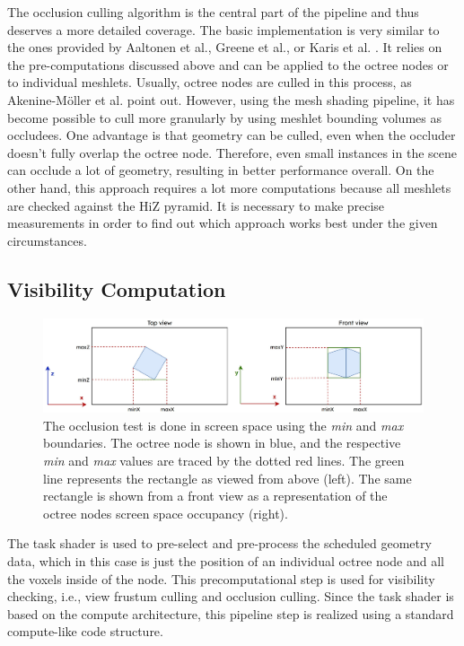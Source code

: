 The occlusion culling algorithm is the central part of the pipeline and thus deserves a more detailed coverage. The 
basic implementation is very similar to the ones provided by Aaltonen et al., Greene et al., or Karis et al. 
\cite{Aaltonen2015,Greene93,Karis2021}. It relies on the pre-computations discussed above and can be applied to the 
octree nodes or to individual meshlets. Usually, octree nodes are culled in this process, as Akenine-Möller et al. 
\cite{AkenineMoeller2018} point out. However, using the mesh shading pipeline, it has become possible to cull more 
granularly by using meshlet bounding volumes as occludees. One advantage is that geometry can be culled, even when 
the occluder doesn't fully overlap the octree node. Therefore, even small instances in the scene can occlude a lot 
of geometry, resulting in better performance overall. On the other hand, this approach requires a lot more 
computations because all meshlets are checked against the \ac{HiZ} pyramid. It is necessary to make precise 
measurements in order to find out which approach works best under the given circumstances.


\subsection*{Visibility Computation} \label{subsec-visibility-computation}

\begin{figure}[!htb]
    \centering
    \includegraphics[width=\linewidth]{images/graphics/screen_space_occlusion_test.jpg}
    \caption{The occlusion test is done in screen space using the \emph{min} and \emph{max} boundaries. The octree node 
    is shown in blue, and the respective \emph{min} and \emph{max} values are traced by the dotted red lines. The green 
    line represents the rectangle as viewed from above (left). The same rectangle is shown from a front view as a 
    representation of the octree nodes screen space occupancy (right).}
    \label{fig:screen-space-occlusion-test}
\end{figure}
\enlargethispage{\baselineskip}

\noindent
The task shader is used to pre-select and pre-process the scheduled geometry data, which in this case is just 
the position of an individual octree node and all the voxels inside of the node. This precomputational step is 
used for visibility checking, i.e., view frustum culling and occlusion culling. Since the task shader is based 
on the compute architecture, this pipeline step is realized using a standard compute-like code structure. \\

